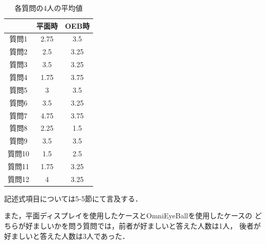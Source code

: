 \begin{table}[tp]
  \begin{center}
  \begin{tabular}{|c|c|c|}
  \hline
       & 平面時  & OEB時 \\ \hline
  質問1  & 2.75 & 3.5  \\ \hline
  質問2  & 2.5  & 3.25 \\ \hline
  質問3  & 3.5  & 3.25 \\ \hline
  質問4  & 1.75 & 3.75 \\ \hline
  質問5  & 3    & 3.5  \\ \hline
  質問6  & 3.5  & 3.25 \\ \hline
  質問7  & 4.75 & 3.75 \\ \hline
  質問8  & 2.25 & 1.5  \\ \hline
  質問9  & 3.5  & 3.5  \\ \hline
  質問10 & 1.5  & 2.5  \\ \hline
  質問11 & 1.75 & 3.25 \\ \hline
  質問12 & 4    & 3.25 \\ \hline
  \end{tabular}\label{ave}
  \caption{各質問の4人の平均値}
\end{center}
  \end{table}

記述式項目については5-5節にて言及する．

また，平面ディスプレイを使用したケースとOmniEyeBallを使用したケースの
どちらが好ましいかを問う質問では，前者が好ましいと答えた人数は1人，
後者が好ましいと答えた人数は3人であった．